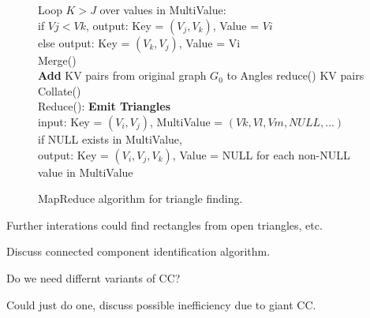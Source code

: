 \begin{figure}[htb]
\begin{center}
{\begin{minipage}{\textwidth}
\begin{tabbing}
	        \> \> Loop $K > J$ over values in MultiValue: \\
		  \> \> if $Vj < Vk$, output: Key = $(V_j,V_k)$, Value = $Vi$ \\
		  \> \> else output: Key = $(V_k,V_j)$, Value = Vi \\
Merge() \\ {\bf Add} KV pairs from original graph $G_0$ to Angles reduce() KV pairs \\
Collate() \\
Reduce(): \> {\bf Emit Triangles} \\
              \> \> input: Key = $(V_i,V_j)$, MultiValue = $(Vk, Vl, Vm, NULL, ...)$ \\
              \> \> if NULL exists in MultiValue, \\
	        \> \> output: Key = $(V_i,V_j,V_k)$, Value = NULL for each non-NULL value in MultiValue

  \end{tabbing}
 \end{minipage}}\end{center}

 \caption{MapReduce algorithm for triangle finding.}

 \label{fig:tri}
\end{figure}

Further interations could find rectangles from open triangles, etc.

Discuss connected component identification algorithm.

Do we need differnt variants of CC?

Could just do one, discuss possible inefficiency due to giant CC.

